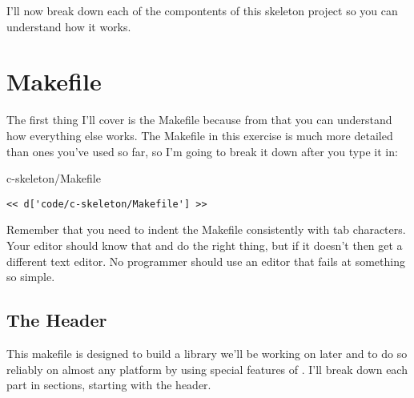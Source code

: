 I'll now break down each of the compontents of this skeleton project
so you can understand how it works.

\section{Makefile}

The first thing I'll cover is the Makefile because from that you can understand
how everything else works.  The Makefile in this exercise is much more detailed
than ones you've used so far, so I'm going to break it down after you type it
in:

\begin{code}{c-skeleton/Makefile}
\begin{lstlisting}
<< d['code/c-skeleton/Makefile'] >>
\end{lstlisting}
\end{code}

Remember that you need to indent the Makefile consistently with tab characters.
Your editor should know that and do the right thing, but if it doesn't then get
a different text editor.  No programmer should use an editor that fails at 
something so simple.

\subsection{The Header}

This makefile is designed to build a library we'll be working on later and 
to do so reliably on almost any platform by using special features of .  I'll break down each part in sections, starting with the header.

